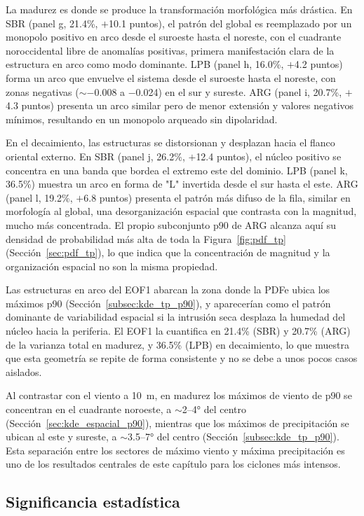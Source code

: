 La madurez es donde se produce la transformación morfológica más drástica. En SBR (panel g, 21.4\%, $+$10.1 puntos), el patrón del global es reemplazado por un monopolo positivo en arco desde el suroeste hasta el noreste, con el cuadrante noroccidental libre de anomalías positivas, primera manifestación clara de la estructura en arco como modo dominante. LPB (panel h, 16.0\%, $+$4.2 puntos) forma un arco que envuelve el sistema desde el suroeste hasta el noreste, con zonas negativas ($\sim$$-$0.008 a $-$0.024) en el sur y sureste. ARG (panel i, 20.7\%, $+$4.3 puntos) presenta un arco similar pero de menor extensión y valores negativos mínimos, resultando en un monopolo arqueado sin dipolaridad.

En el decaimiento, las estructuras se distorsionan y desplazan hacia el flanco oriental externo. En SBR (panel j, 26.2\%, $+$12.4 puntos), el núcleo positivo se concentra en una banda que bordea el extremo este del dominio. LPB (panel k, 36.5\%) muestra un arco en forma de "L" invertida desde el sur hasta el este. ARG (panel l, 19.2\%, $+$6.8 puntos) presenta el patrón más difuso de la fila, similar en morfología al global, una desorganización espacial que contrasta con la magnitud, mucho más concentrada. El propio subconjunto p90 de ARG alcanza aquí su densidad de probabilidad más alta de toda la Figura~\ref{fig:pdf_tp} (Sección~\ref{sec:pdf_tp}), lo que indica que la concentración de magnitud y la organización espacial no son la misma propiedad.

Las estructuras en arco del EOF1 abarcan la zona donde la PDFe ubica los máximos p90 (Sección~\ref{subsec:kde_tp_p90}), y aparecerían como el patrón dominante de variabilidad espacial si la intrusión seca desplaza la humedad del núcleo hacia la periferia. El EOF1 la cuantifica en 21.4\% (SBR) y 20.7\% (ARG) de la varianza total en madurez, y 36.5\% (LPB) en decaimiento, lo que muestra que esta geometría se repite de forma consistente y no se debe a unos pocos casos aislados.

Al contrastar con el viento a 10~m, en madurez los máximos de viento de p90 se concentran en el cuadrante noroeste, a ${\sim}$2--4° del centro (Sección~\ref{sec:kde_espacial_p90}), mientras que los máximos de precipitación se ubican al este y sureste, a ${\sim}$3.5--7° del centro (Sección~\ref{subsec:kde_tp_p90}). Esta separación entre los sectores de máximo viento y máxima precipitación es uno de los resultados centrales de este capítulo para los ciclones más intensos.

\subsection{Significancia estadística}\label{subsec:significancia_tp}

